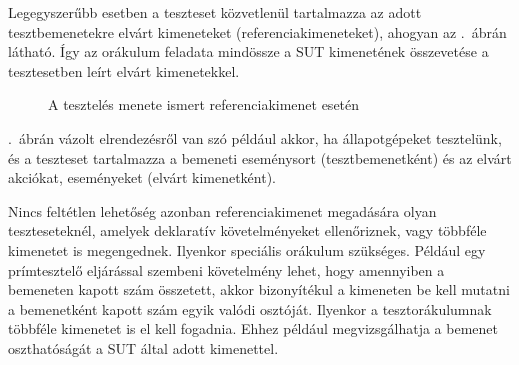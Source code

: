 Legegyszerűbb esetben a teszteset közvetlenül tartalmazza az adott tesztbemenetekre elvárt kimeneteket (referenciakimeneteket), ahogyan az .~ábrán látható. Így az orákulum feladata mindössze a SUT kimenetének összevetése a tesztesetben leírt elvárt kimenetekkel.

\begin{figure}[h]
	\centering
	
	
	\caption{A tesztelés menete ismert referenciakimenet esetén}
	\label{fig:teszteles-elrendezes-elvart-kimenet}
\end{figure}

.~ábrán vázolt elrendezésről van szó például akkor, ha állapotgépeket tesztelünk, és a teszteset tartalmazza a bemeneti eseménysort (tesztbemenetként) és az elvárt akciókat, eseményeket (elvárt kimenetként). 

Nincs feltétlen lehetőség azonban referenciakimenet megadására olyan teszteseteknél, amelyek deklaratív követelményeket ellenőriznek, vagy többféle kimenetet is megengednek. Ilyenkor speciális orákulum szükséges. Például egy prímtesztelő eljárással szembeni követelmény lehet, hogy amennyiben a bemeneten kapott szám összetett, akkor bizonyítékul a kimeneten be kell mutatni a bemenetként kapott szám egyik valódi osztóját. Ilyenkor a tesztorákulumnak többféle kimenetet is el kell fogadnia. Ehhez például megvizsgálhatja a bemenet oszthatóságát a SUT által adott kimenettel.

